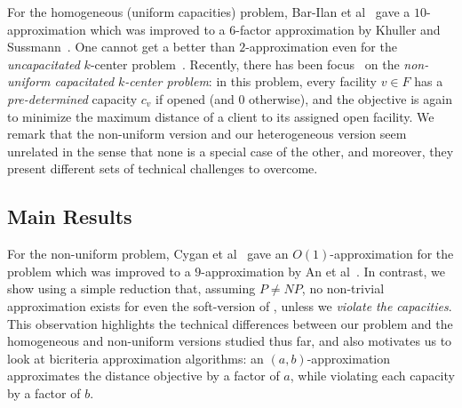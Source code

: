 For the homogeneous (uniform capacities) problem, Bar-Ilan et al~\cite{Bar-IlanKP93} gave a $10$-approximation which was improved to a $6$-factor approximation by Khuller and Sussmann~\cite{KhullerS00}. One cannot get a better than $2$-approximation even for the {\em uncapacitated} $k$-center problem~\cite{HochbaumS85}. Recently, there has been focus~\cite{CyganHK12,AnBCGMS14} on the {\em non-uniform capacitated $k$-center problem}: in this problem, every facility $v\in F$ has a \emph{pre-determined} capacity $c_v$ if opened (and $0$ otherwise), and the objective is again to minimize the maximum distance of a client to its assigned open facility. We remark that the non-uniform version and our heterogeneous version seem unrelated in the sense that none is a special case of the other, and moreover, they present different sets of technical challenges to overcome.

\subsection{Main Results}

For the non-uniform problem, Cygan et al~\cite{CyganHK12} gave an $O(1)$-approximation for the problem which was improved to a $9$-approximation by An et al~\cite{AnBCGMS14}. In contrast, we show using a simple reduction that, assuming $P \neq NP$, no non-trivial approximation exists for even the soft-version of \mckc, unless we {\em violate the capacities}. This observation highlights the technical differences between our problem and the homogeneous and non-uniform versions studied thus far, and also motivates us to look at bicriteria approximation algorithms: an $(a,b)$-approximation approximates the distance objective by a factor of $a$, while violating each capacity by a factor of $b$.



